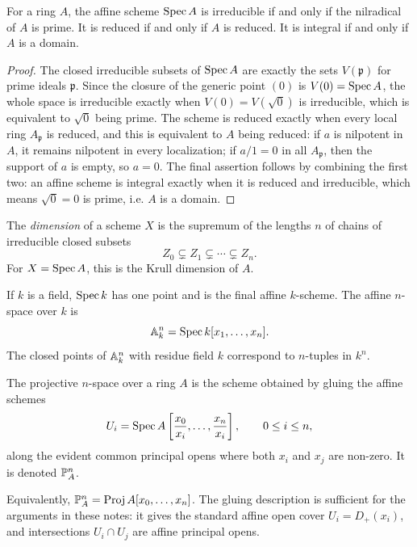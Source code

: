 \begin{proposition}
For a ring \(A\), the affine scheme \(\Spec A\) is irreducible if and only if
the nilradical of \(A\) is prime.  It is reduced if and only if \(A\) is
reduced.  It is integral if and only if \(A\) is a domain.
\end{proposition}

\begin{proof}
The closed irreducible subsets of \(\Spec A\) are exactly the sets
\(V(\mathfrak p)\) for prime ideals \(\mathfrak p\).  Since the closure of the
generic point \((0)\) is \(V(0)=\Spec A\), the whole space is irreducible
exactly when \(V(0)=V(\sqrt{0})\) is irreducible, which is equivalent to
\(\sqrt{0}\) being prime.  The scheme is reduced exactly when every local ring
\(A_{\mathfrak p}\) is reduced, and this is equivalent to \(A\) being reduced:
if \(a\) is nilpotent in \(A\), it remains nilpotent in every localization; if
\(a/1=0\) in all \(A_{\mathfrak p}\), then the support of \(a\) is empty, so
\(a=0\).  The final assertion follows by combining the first two: an affine
scheme is integral exactly when it is reduced and irreducible, which means
\(\sqrt{0}=0\) is prime, i.e. \(A\) is a domain.
\end{proof}

\begin{definition}
The \emph{dimension} of a scheme \(X\) is the supremum of the lengths \(n\) of
chains of irreducible closed subsets
\[
    Z_0\subsetneq Z_1\subsetneq \cdots \subsetneq Z_n.
\]
For \(X=\Spec A\), this is the Krull dimension of \(A\).
\end{definition}

\begin{example}
If \(k\) is a field, \(\Spec k\) has one point and is the final affine
\(k\)-scheme.  The affine \(n\)-space over \(k\) is
\[
    \AA^n_k=\Spec k[x_1,\ldots,x_n].
\]
The closed points of \(\AA^n_k\) with residue field \(k\) correspond to
\(n\)-tuples in \(k^n\).
\end{example}

\begin{definition}
The projective \(n\)-space over a ring \(A\) is the scheme obtained by gluing
the affine schemes
\[
    U_i=\Spec A\left[\frac{x_0}{x_i},\ldots,\frac{x_n}{x_i}\right],
    \qquad 0\le i\le n,
\]
along the evident common principal opens where both \(x_i\) and \(x_j\) are
non-zero.  It is denoted \(\PP^n_A\).
\end{definition}

\begin{remark}
Equivalently, \(\PP^n_A=\Proj A[x_0,\ldots,x_n]\).  The gluing description is
sufficient for the arguments in these notes: it gives the standard affine open
cover \(U_i=D_+(x_i)\), and intersections \(U_i\cap U_j\) are affine principal
opens.
\end{remark}

